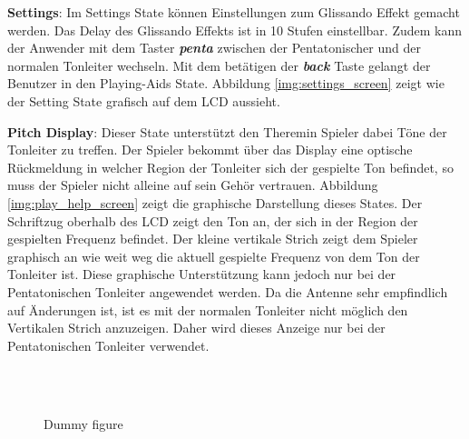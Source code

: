 \textbf{Settings}:
Im Settings State können Einstellungen zum Glissando Effekt gemacht werden. Das Delay des Glissando Effekts ist in 10 Stufen einstellbar. Zudem kann der Anwender mit dem Taster \textbf{\textit{penta}} zwischen der Pentatonischer und der normalen Tonleiter wechseln. Mit dem betätigen der \textbf{\textit{back}} Taste gelangt der Benutzer in den Playing-Aids State. Abbildung \ref{img:settings_screen} zeigt wie der Setting State grafisch auf dem LCD aussieht.

\textbf{Pitch Display}:
Dieser State unterstützt den Theremin Spieler dabei Töne der Tonleiter zu treffen. Der Spieler bekommt über das Display eine optische Rückmeldung in welcher Region der Tonleiter sich der gespielte Ton befindet, so muss der Spieler nicht alleine auf sein Gehör vertrauen.
Abbildung \ref{img:play_help_screen} zeigt die graphische Darstellung dieses States.  
Der Schriftzug oberhalb des LCD zeigt den Ton an, der sich in der Region der gespielten Frequenz befindet. 
Der kleine vertikale Strich zeigt dem Spieler graphisch an wie weit weg die aktuell gespielte Frequenz von dem Ton der Tonleiter ist. 
Diese graphische Unterstützung kann jedoch nur bei der Pentatonischen Tonleiter angewendet werden.  Da die Antenne sehr empfindlich auf Änderungen ist, ist es mit der normalen Tonleiter nicht möglich den Vertikalen Strich anzuzeigen. Daher wird dieses Anzeige nur bei der Pentatonischen Tonleiter verwendet.

\begin{figure}[!ht]
	\hfill
	\hfill
	\\
	\hfill
	\hfill
	\\
	\hfill

	\caption{Dummy figure}
	\label{fig:dummy}
\end{figure}
